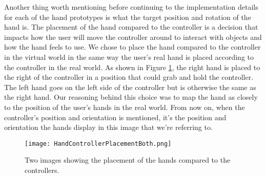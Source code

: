 Another thing worth mentioning before continuing to the implementation details for each of the hand prototypes is what the target position and rotation of the hand is. The placement of the hand compared to the controller is a decision that impacts how the user will move the controller around to interact with objects and how the hand feels to use. We chose to place the hand compared to the controller in the virtual world in the same way the user's real hand is placed according to the controller in the real world. As shown in Figure \ref{fig:handControllerPlacement}, the right hand is placed to the right of the controller in a position that could grab and hold the controller. The left hand goes on the left side of the controller but is otherwise the same as the right hand. Our reasoning behind this choice was to map the hand as closely to the position of the user's hands in the real world. From now on, when the controller's position and orientation is mentioned, it's the position and orientation the hands display in this image that we're referring to.

\begin{figure}[h]
\centering
\texttt{[image: HandControllerPlacementBoth.png]}
\caption{Two images showing the placement of the hands compared to the controllers.}
\label{fig:handControllerPlacement}
\end{figure}


